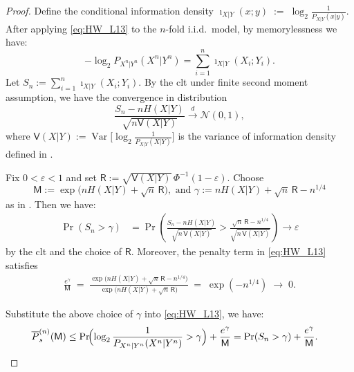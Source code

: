 \documentclass[onecolumn]{IEEEtran} %
\newcommand{\Var}{\operatorname{Var}}
\newcommand{\1}{\mathbbm{1}}
\theoremstyle{boldremark}
\begin{document}
\begin{proof}
Define the conditional information density $  \imath_{X|Y}(x;y) \;:=\; \log_2\frac{1}{P_{X|Y}(x|y)}.$
After applying \eqref{eq:HW_L13} to the $n$-fold i.i.d.\ model, by memorylessness we have:
\[
  -\log_2 P_{X^n|Y^n}(X^n|Y^n)
  =
  \sum_{i=1}^n \imath_{X|Y}(X_i;Y_i).
\]
Let $S_n := \sum_{i=1}^n \imath_{X|Y}(X_i;Y_i)$.  By the \gls{clt} under finite second moment assumption, we have the convergence in distribution
\[
  \frac{S_n - nH(X|Y)}{\sqrt{n\textsf{V}(X|Y)}} \xrightarrow{d} \mathcal{N}(0,1),
\]
where $\textsf{V}(X|Y):=\Var\!\bigl[\log_2\frac{1}{P_{X|Y}(X|Y)}\bigr]$ is the variance of information density
defined in \cite[(9)]{Hayashi_SWC_Entropy20}.

Fix $0<\varepsilon<1$ and set $  \textsf{R} := \sqrt{\textsf{V}(X|Y)}\,\Phi^{-1}(1-\varepsilon).$
Choose
\[
  \textsf{M} := \exp\!\bigl(nH(X|Y)+\sqrt{n}\,\textsf{R}\bigr),
  \mbox{ and }
  \gamma := nH(X|Y)+\sqrt{n}\,\textsf{R} - n^{1/4}
\]
as in \cite[Proof of Theorem~11]{Hayashi_SWC_Entropy20}. Then we have:
\begin{align}
  \Pr(S_n>\gamma)
  &=
  \Pr\!\left(
      \frac{S_n-nH(X|Y)}{\sqrt{n\,\textsf{V}(X|Y)}}
      >
      \frac{\sqrt{n}\,\textsf{R}-n^{1/4}}{\sqrt{n\,\textsf{V}(X|Y)}}
    \right)
  \to \varepsilon
  \label{EQ_Pr_S_ge_gamma_approach_epsilon}
\end{align}
by the \gls{clt} and the choice of $\textsf{R}$.
Moreover, the penalty term in \eqref{eq:HW_L13} satisfies
\begin{align}
  \frac{e^\gamma}{\textsf{M}}
  \;=\;
  \frac{\exp\!\bigl(nH(X|Y)+\sqrt{n}\,\textsf{R}-n^{1/4}\bigr)}
       {\exp\!\bigl(nH(X|Y)+\sqrt{n}\,\textsf{R}\bigr)}
  \;=\;
  \exp(-n^{1/4})
  \;\to\;
  0.
  \label{EQ_penalty_to_zero}
\end{align}

Substitute the above choice of $\gamma$ into \eqref{eq:HW_L13}, we have:
\begin{align}
  \overline{P}_s^{(n)}(\textsf{M})
  &\le
  \Pr\!\Bigl(\log_2\frac{1}{P_{X^n|Y^n}(X^n|Y^n)}>\gamma\Bigr)
  +\frac{e^\gamma}{\textsf{M}}=
  \Pr(S_n>\gamma)
  +\frac{e^\gamma}{\textsf{M}}.
  \label{EQ_substitute_gamma_into_HW13}
\end{align}


\end{proof}
\end{document}
